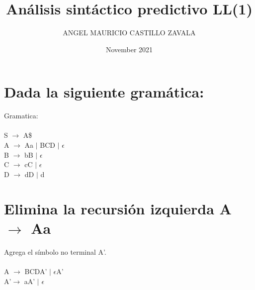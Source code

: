 \documentclass[12pt]{article}
\title{Análisis sintáctico predictivo LL(1)}
\author{ANGEL MAURICIO CASTILLO ZAVALA}
\date{November 2021}
\begin{document}
\maketitle

\section{Dada la siguiente gramática: }
Gramatica: \\\\
    S {$\rightarrow$} A\$ \\
	A {$\rightarrow$}  Aa $\mid$ BCD $\mid$ $\epsilon$ \\
	B {$\rightarrow$} bB $\mid$ $\epsilon$ \\
	C {$\rightarrow$} cC $\mid$ $\epsilon$\\
	D {$\rightarrow$} dD $\mid$ d

\section{Elimina la recursión izquierda A $\rightarrow$ Aa}
Agrega el símbolo no terminal A’.\\\\
           A $\rightarrow$ BCDA' $\mid$ $\epsilon$A'\\
          A’$\rightarrow$ aA' $\mid$ $\epsilon$ \\
\end{document}

